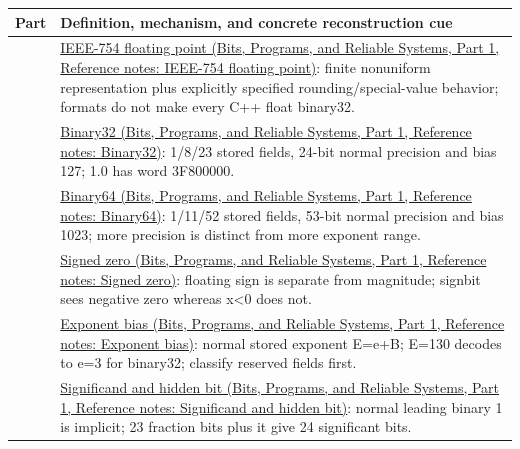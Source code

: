 \hypertarget{appendix-fd090d982a15-m004---parts-61-76}{}

{\def\LTcaptype{none} %
\begin{longtable}[]{@{}
  >{\raggedright\arraybackslash}p{}
  >{\raggedright\arraybackslash}p{}@{}}
\toprule\noalign{}
\begin{minipage}[b]{\linewidth}\raggedright
Part
\end{minipage} & \begin{minipage}[b]{\linewidth}\raggedright
Definition, mechanism, and concrete reconstruction cue
\end{minipage} \\
\midrule\noalign{}
\endhead
\bottomrule\noalign{}
\endlastfoot
61 & \href{../01-Bits-Programs-and-Reliable-Systems-P01/main.pdf\#nameddest=appendix-343615f49ddf}{IEEE-754 floating point (Bits, Programs, and Reliable Systems, Part 1, Reference notes: IEEE-754 floating point)}: finite nonuniform representation plus explicitly specified rounding/special-value behavior; formats do not make every C++ float binary32. \\
62 & \href{../01-Bits-Programs-and-Reliable-Systems-P01/main.pdf\#nameddest=appendix-5057f9ad327f}{Binary32 (Bits, Programs, and Reliable Systems, Part 1, Reference notes: Binary32)}: 1/8/23 stored fields, 24-bit normal precision and bias 127; 1.0 has word 3F800000. \\
63 & \href{../01-Bits-Programs-and-Reliable-Systems-P01/main.pdf\#nameddest=appendix-5078dfab64e6}{Binary64 (Bits, Programs, and Reliable Systems, Part 1, Reference notes: Binary64)}: 1/11/52 stored fields, 53-bit normal precision and bias 1023; more precision is distinct from more exponent range. \\
64 & \href{../01-Bits-Programs-and-Reliable-Systems-P01/main.pdf\#nameddest=appendix-3a048f032c1f}{Signed zero (Bits, Programs, and Reliable Systems, Part 1, Reference notes: Signed zero)}: floating sign is separate from magnitude; signbit sees negative zero whereas x\textless0 does not. \\
65 & \href{../01-Bits-Programs-and-Reliable-Systems-P01/main.pdf\#nameddest=appendix-2fae058c82e1}{Exponent bias (Bits, Programs, and Reliable Systems, Part 1, Reference notes: Exponent bias)}: normal stored exponent E=e+B; E=130 decodes to e=3 for binary32; classify reserved fields first. \\
66 & \href{../01-Bits-Programs-and-Reliable-Systems-P01/main.pdf\#nameddest=appendix-a24fd710cf67}{Significand and hidden bit (Bits, Programs, and Reliable Systems, Part 1, Reference notes: Significand and hidden bit)}: normal leading binary 1 is implicit; 23 fraction bits plus it give 24 significant bits. \\

\end{longtable}}
